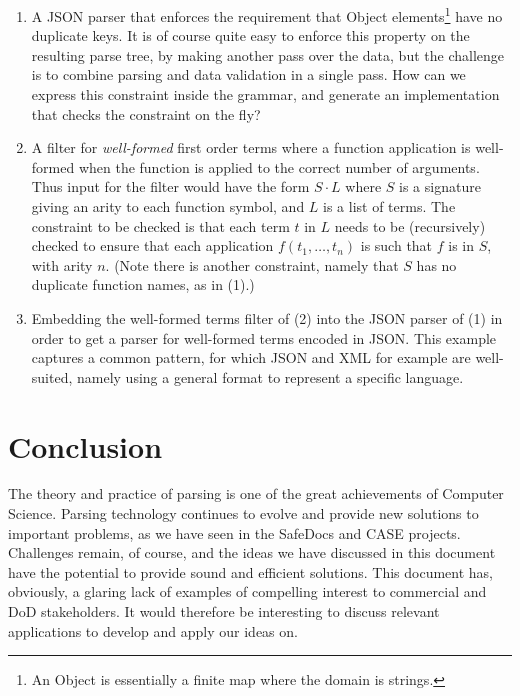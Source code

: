 \documentclass{article}
\theoremstyle{definition}
\begin{document}
\begin{enumerate}

\item A JSON parser that enforces the requirement that \textsf{Object}
  elements\footnote{An \textsf{Object} is essentially a finite map
    where the domain is strings.} have no duplicate keys. It is of
  course quite easy to enforce this property on the resulting parse
  tree, by making another pass over the data, but the challenge is to
  combine parsing and data validation in a single pass. How can we
  express this constraint inside the grammar, and generate an
  implementation that checks the constraint on the fly?

\item A filter for \emph{well-formed} first order terms where a
  function application is well-formed when the function is applied to
  the correct number of arguments. Thus input for the filter would
  have the form $S \cdot L$ where $S$ is a signature giving an arity
  to each function symbol, and $L$ is a list of terms. The constraint
  to be checked is that each term $t$ in $L$ needs to be (recursively)
  checked to ensure that each application $f(t_1,\ldots,t_n)$ is such
  that $f$ is in $S$, with arity $n$.  (Note there is another
  constraint, namely that $S$ has no duplicate function names, as in
  (1).)

\item Embedding the well-formed terms filter of (2) into the JSON parser of
  (1) in order to get a parser for well-formed terms encoded in
  JSON. This example captures a common pattern, for which JSON and XML
  for example are well-suited, namely using a general format to
  represent a specific language.

\end{enumerate}

\section{Conclusion}

The theory and practice of parsing is one of the great achievements of
Computer Science. Parsing technology continues to evolve and provide
new solutions to important problems, as we have seen in the SafeDocs
and CASE projects. Challenges remain, of course, and the ideas we have
discussed in this document have the potential to provide sound and
efficient solutions. This document has, obviously, a glaring lack of
examples of compelling interest to commercial and DoD stakeholders. It
would therefore be interesting to discuss relevant applications to
develop and apply our ideas on.
\end{document}
